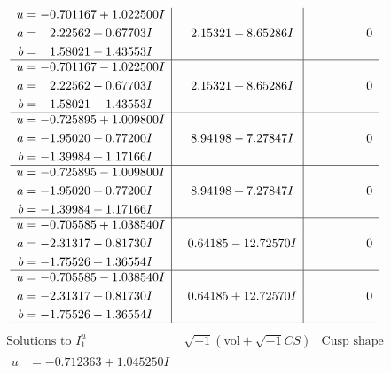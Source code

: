 \documentclass[1p]{elsarticle_modified}
\theoremstyle{definition}
\newcommand{\I}{\sqrt{-1}}
\begin{document}
$$\begin{array}{c|c|c}
\begin{aligned}
u &= -0.701167 + 1.022500 I \\
a &= \phantom{-}2.22562 + 0.67703 I \\
b &= \phantom{-}1.58021 - 1.43553 I\end{aligned}
 & \phantom{-}2.15321 - 8.65286 I & \phantom{-0.000000 } 0 \\ \hline\begin{aligned}
u &= -0.701167 - 1.022500 I \\
a &= \phantom{-}2.22562 - 0.67703 I \\
b &= \phantom{-}1.58021 + 1.43553 I\end{aligned}
 & \phantom{-}2.15321 + 8.65286 I & \phantom{-0.000000 } 0 \\ \hline\begin{aligned}
u &= -0.725895 + 1.009800 I \\
a &= -1.95020 - 0.77200 I \\
b &= -1.39984 + 1.17166 I\end{aligned}
 & \phantom{-}8.94198 - 7.27847 I & \phantom{-0.000000 } 0 \\ \hline\begin{aligned}
u &= -0.725895 - 1.009800 I \\
a &= -1.95020 + 0.77200 I \\
b &= -1.39984 - 1.17166 I\end{aligned}
 & \phantom{-}8.94198 + 7.27847 I & \phantom{-0.000000 } 0 \\ \hline\begin{aligned}
u &= -0.705585 + 1.038540 I \\
a &= -2.31317 - 0.81730 I \\
b &= -1.75526 + 1.36554 I\end{aligned}
 & \phantom{-}0.64185 - 12.72570 I & \phantom{-0.000000 } 0 \\ \hline\begin{aligned}
u &= -0.705585 - 1.038540 I \\
a &= -2.31317 + 0.81730 I \\
b &= -1.75526 - 1.36554 I\end{aligned}
 & \phantom{-}0.64185 + 12.72570 I & \phantom{-0.000000 } 0\\
 \hline 
 \end{array}$$\newpage$$\begin{array}{c|c|c}  
\text{Solutions to }I^u_{1}& \I (\text{vol} + \sqrt{-1}CS) & \text{Cusp shape}\\
 \hline 
\begin{aligned}
u &= -0.712363 + 1.045250 I \\

\end{aligned}
\end{array}$$
\end{document}
